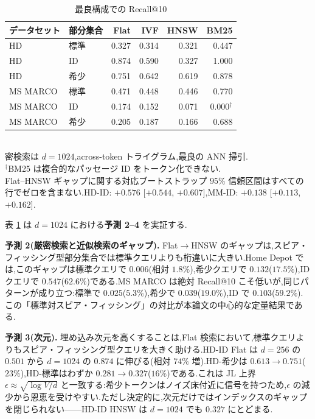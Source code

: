 \documentclass[conference]{IEEEtran}
\begin{document}
\begin{table}[t]
\centering
\small
\caption{最良構成での Recall@10}
\label{tab:detailed-results}
\setlength{\tabcolsep}{4pt}
\begin{tabular}{llrrrr}
\toprule
\textbf{データセット} & \textbf{部分集合} & \textbf{Flat} & \textbf{IVF} & \textbf{HNSW} & \textbf{BM25} \\
\midrule
HD       & 標準   & 0.327 & 0.314 & 0.321 & 0.447 \\
HD       & ID     & 0.874 & 0.590 & 0.327 & 1.000 \\
HD       & 希少   & 0.751 & 0.642 & 0.619 & 0.878 \\
\midrule
MS MARCO & 標準   & 0.471 & 0.448 & 0.446 & 0.770 \\
MS MARCO & ID     & 0.174 & 0.152 & 0.071 & 0.000$^{\dagger}$ \\
MS MARCO & 希少   & 0.205 & 0.187 & 0.166 & 0.688 \\
\bottomrule
\end{tabular}
\\[2pt]
{\footnotesize 密検索は $d{=}1024$,across-token トライグラム,最良の ANN 掃引.\\
$^{\dagger}$BM25 は複合的なパッセージ ID をトークン化できない.\\
Flat--HNSW ギャップに関する対応ブートストラップ $95\%$ 信頼区間はすべての行でゼロを含まない.HD-ID: $+0.576$ [$+0.544$, $+0.607$],MM-ID: $+0.138$ [$+0.113$, $+0.162$].}
\end{table}

表 \ref{tab:detailed-results} は $d{=}1024$ における\textbf{予測 2--4} を実証する.

\textbf{予測 2(厳密検索と近似検索のギャップ).} Flat$\to$HNSW のギャップは,スピア・フィッシング型部分集合では標準クエリよりも桁違いに大きい.Home Depot では,このギャップは標準クエリで $0.006$(相対 $1.8\%$),希少クエリで $0.132$($17.5\%$),ID クエリで $0.547$($62.6\%$)である.MS MARCO は絶対 Recall@10 こそ低いが,同じパターンが成り立つ:標準で $0.025$($5.3\%$),希少で $0.039$($19.0\%$),ID で $0.103$($59.2\%$).この「標準対スピア・フィッシング」の対比が本論文の中心的な定量結果である.

\textbf{予測 3(次元).} 埋め込み次元を高くすることは,Flat 検索において,標準クエリよりもスピア・フィッシング型クエリを大きく助ける.HD-ID Flat は $d{=}256$ の $0.501$ から $d{=}1024$ の $0.874$ に伸びる(相対 $74\%$ 増).HD-希少は $0.613 \to 0.751$($23\%$),HD-標準はわずか $0.281 \to 0.327$($16\%$)である.これは JL 上界 $\epsilon\!\approx\!\sqrt{\log V / d}$ と一致する:希少トークンはノイズ床付近に信号を持つため,$\epsilon$ の減少から恩恵を受けやすい.ただし決定的に,次元だけではインデックスのギャップを閉じられない——HD-ID HNSW は $d{=}1024$ でも $0.327$ にとどまる.
\end{document}
